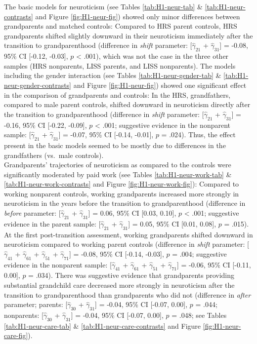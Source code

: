 \documentclass[
  english,
  man, noextraspace]{apa7}
\begin{document}
The basic models for neuroticism (see Tables \ref{tab:H1-neur-tab} \& \ref{tab:H1-neur-contrasts} and Figure \ref{fig:H1-neur-fig}) showed only minor differences between grandparents and matched controls: Compared to HRS parent controls, HRS grandparents shifted slightly downward in their neuroticism immediately after the transition to grandparenthood (difference in \emph{shift} parameter: {[}\(\hat{\gamma}_{21}\) + \(\hat{\gamma}_{31}\){]} = -0.08, 95\% CI {[}-0.12, -0.03{]}, \(p\) \textless{} .001), which was not the case in the three other samples (HRS nonparents, LISS parents, and LISS nonparents). The models including the gender interaction (see Tables \ref{tab:H1-neur-gender-tab} \& \ref{tab:H1-neur-gender-contrasts} and Figure \ref{fig:H1-neur-fig}) showed one significant effect in the comparison of grandparents and controls: In the HRS, grandfathers, compared to male parent controls, shifted downward in neuroticism directly after the transition to grandparenthood (difference in \emph{shift} parameter: {[}\(\hat{\gamma}_{21}\) + \(\hat{\gamma}_{31}\){]} = -0.16, 95\% CI {[}-0.22, -0.09{]}, \(p\) \textless{} .001; suggestive evidence in the nonparent sample: {[}\(\hat{\gamma}_{21}\) + \(\hat{\gamma}_{31}\){]} = -0.07, 95\% CI {[}-0.14, -0.01{]}, \(p\) = .024). Thus, the effect present in the basic models seemed to be mostly due to differences in the grandfathers (vs.~male controls).\\
Grandparents' trajectories of neuroticism as compared to the controls were significantly moderated by paid work (see Tables \ref{tab:H1-neur-work-tab} \& \ref{tab:H1-neur-work-contrasts} and Figure \ref{fig:H1-neur-work-fig}): Compared to working nonparent controls, working grandparents increased more strongly in neuroticism in the years before the transition to grandparenthood (difference in \emph{before} parameter: {[}\(\hat{\gamma}_{21}\) + \(\hat{\gamma}_{31}\){]} = 0.06, 95\% CI {[}0.03, 0.10{]}, \(p\) \textless{} .001; suggestive evidence in the parent sample: {[}\(\hat{\gamma}_{21}\) + \(\hat{\gamma}_{31}\){]} = 0.05, 95\% CI {[}0.01, 0.08{]}, \(p\) = .015). At the first post-transition assessment, working grandparents shifted downward in neuroticism compared to working parent controls (difference in \emph{shift} parameter: {[}\(\hat{\gamma}_{41}\) + \(\hat{\gamma}_{61}\) + \(\hat{\gamma}_{51}\) + \(\hat{\gamma}_{71}\){]} = -0.08, 95\% CI {[}-0.14, -0.03{]}, \(p\) = .004; suggestive evidence in the nonparent sample: {[}\(\hat{\gamma}_{41}\) + \(\hat{\gamma}_{61}\) + \(\hat{\gamma}_{51}\) + \(\hat{\gamma}_{71}\){]} = -0.06, 95\% CI {[}-0.11, 0.00{]}, \(p\) = .034). There was suggestive evidence that grandparents providing substantial grandchild care decreased more strongly in neuroticism after the transition to grandparenthood than grandparents who did not (difference in \emph{after} parameter; parents: {[}\(\hat{\gamma}_{30}\) + \(\hat{\gamma}_{31}\){]} = -0.04, 95\% CI {[}-0.07, 0.00{]}, \(p\) = .044; nonparents: {[}\(\hat{\gamma}_{30}\) + \(\hat{\gamma}_{31}\){]} = -0.04, 95\% CI {[}-0.07, 0.00{]}, \(p\) = .048; see Tables \ref{tab:H1-neur-care-tab} \& \ref{tab:H1-neur-care-contrasts} and Figure \ref{fig:H1-neur-care-fig}).
\end{document}
